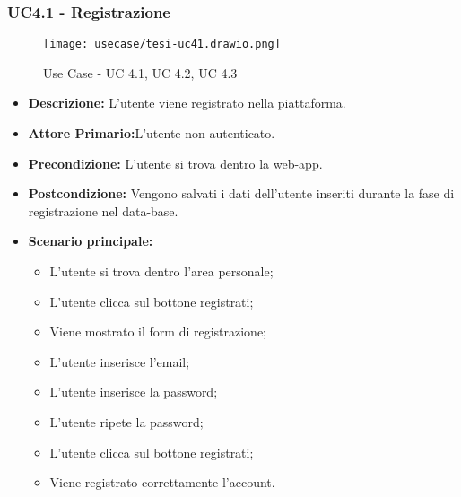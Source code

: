 \subsubsection{UC4.1 - Registrazione}
\begin{figure}[H]
    \centering
    \texttt{[image: usecase/tesi-uc41.drawio.png]}
    \caption{Use Case - UC 4.1, UC 4.2, UC 4.3}
\end{figure}
\begin{itemize}
    \item \textbf{Descrizione:} L'utente viene registrato nella piattaforma.
    \item \textbf{Attore Primario:}L'utente non autenticato.
    \item \textbf{Precondizione:} L'utente si trova dentro la web-app.
    \item \textbf{Postcondizione:} Vengono salvati i dati dell'utente inseriti durante la fase di registrazione nel data-base.
    \item \textbf{Scenario principale:}
    \begin{itemize}
        \item L'utente si trova dentro l'area personale;
        \item L'utente clicca sul bottone registrati;
        \item Viene mostrato il form di registrazione;
        \item L'utente inserisce l'email;
        \item L'utente inserisce la password;
        \item L'utente ripete la password;
        \item L'utente clicca sul bottone registrati;
        \item Viene registrato correttamente l'account.
    \end{itemize}
\end{itemize}
